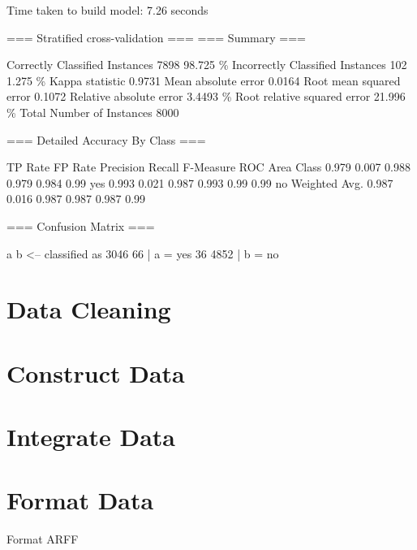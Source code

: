 Time taken to build model: 7.26 seconds

=== Stratified cross-validation ===
=== Summary ===

Correctly Classified Instances        7898               98.725  \%
Incorrectly Classified Instances       102                1.275  \%
Kappa statistic                          0.9731
Mean absolute error                      0.0164
Root mean squared error                  0.1072
Relative absolute error                  3.4493 \%
Root relative squared error             21.996  \%
Total Number of Instances             8000     

=== Detailed Accuracy By Class ===

TP Rate   FP Rate   Precision   Recall  F-Measure   ROC Area  Class
0.979     0.007      0.988     0.979     0.984      0.99     yes
0.993     0.021      0.987     0.993     0.99       0.99     no
Weighted Avg.    0.987     0.016      0.987     0.987     0.987      0.99 

=== Confusion Matrix ===

a    b   <-- classified as
3046   66 |    a = yes
36 4852 |    b = no


\section{Data Cleaning}

\section{Construct Data}

\section{Integrate Data}

\section{Format Data}
Format ARFF
